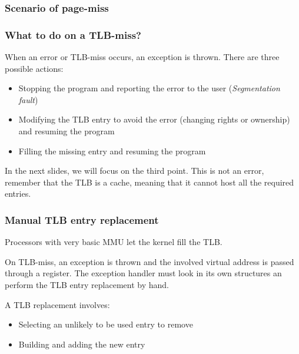 
\begin{frame}
  \frametitle{Scenario of page-miss}

  \begin{center}
  \end{center}

\end{frame}


\begin{frame}
  \frametitle{What to do on a TLB-miss?}

  When an error or TLB-miss occurs, an exception is thrown. There are
  three possible actions:

  \begin{itemize}
  \item
    Stopping the program and reporting the error to the user
    (\emph{Segmentation fault})
  \item
    Modifying the TLB entry to avoid the error (changing rights or
    ownership) and resuming the program
  \item
    Filling the missing entry and resuming the program
  \end{itemize}

  \-

  In the next slides, we will focus on the third point. This is not an
  error, remember that the TLB is a cache, meaning that it cannot host
  all the required entries.

\end{frame}


\begin{frame}
  \frametitle{Manual TLB entry replacement}

  Processors with very basic MMU let the kernel fill the TLB.

  \-

  On TLB-miss, an exception is thrown and the involved virtual address
  is passed through a register. The exception handler must look in its
  own structures an perform the TLB entry replacement by hand.

  \-

  A TLB replacement involves:

  \begin{itemize}
  \item
    Selecting an unlikely to be used entry to remove
  \item
    Building and adding the new entry
  \end{itemize}

\end{frame}

